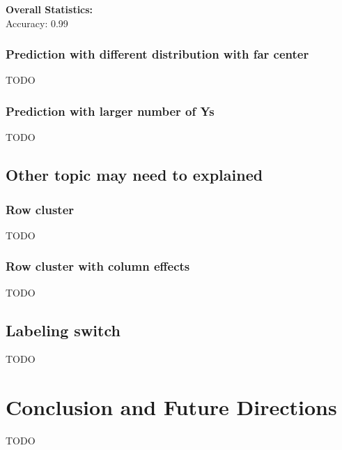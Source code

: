 \documentclass{article}
\begin{document}
    \noindent\textbf{Overall Statistics:} \\
    Accuracy: 0.99

\subsubsection*{Prediction with different distribution with far center}

TODO

\subsubsection*{Prediction with larger number of Ys}

TODO

\subsection{Other topic may need to explained}

\subsubsection{Row cluster}

TODO

\subsubsection{Row cluster with column effects}

TODO


\subsection{Labeling switch}

TODO

\section{Conclusion and Future Directions}

TODO

\printbibliography
\end{document}
